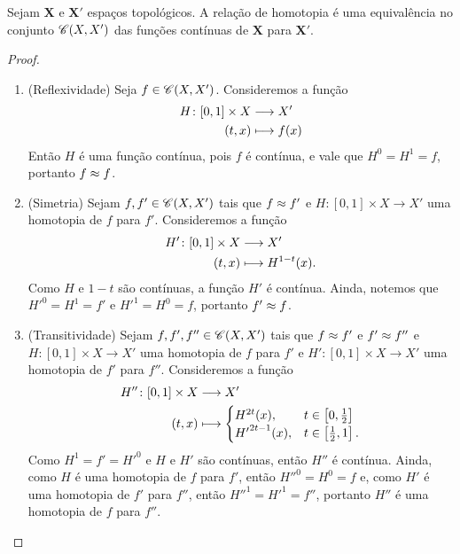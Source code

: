 \begin{proposition}
Sejam $\bm X$ e $\bm X'$ espaços topológicos. A relação de homotopia é uma equivalência no conjunto $\mathscr{C}(X,X')$ das funções contínuas de $\bm X$ para $\bm X'$.
\end{proposition}
\begin{proof}
	\begin{enumerate}
	\item (Reflexividade) Seja $f \in \mathscr{C}(X,X')$. Consideremos a função
		\begin{align*}
		{H}\colon {[0,1] \times X} &\longrightarrow {X'} \\{(t,x)} &\longmapsto f(x)
		\end{align*}
Então $H$ é uma função contínua, pois $f$ é contínua, e vale que $H^0 = H^1 = f$, portanto $f \approx f$.
	
	\item (Simetria) Sejam $f,f' \in \mathscr{C}(X,X')$ tais que $f \approx f'$ e $H\colon [0,1] \times X \to X'$ uma homotopia de $f$ para $f'$. Consideremos a função
		\begin{align*}
		{H'}\colon {[0,1] \times X} &\longrightarrow {X'} \\{(t,x)} &\longmapsto H^{1-t}(x).
		\end{align*}
Como $H$ e $1-t$ são contínuas, a função $H'$ é contínua. Ainda, notemos que ${H'}^0 = H^1 = f'$ e ${H'}^1 = H^0 = f$, portanto $f' \approx f$.

	\item (Transitividade) Sejam $f,f',f'' \in \mathscr{C}(X,X')$ tais que $f \approx f'$ e $f' \approx f''$ e $H\colon [0,1] \times X \to X'$ uma homotopia de $f$ para $f'$ e $H'\colon [0,1] \times X \to X'$ uma homotopia de $f'$ para $f''$. Consideremos a função
		\begin{align*}
		\func{H''}{[0,1] \times X}{X'}{(t,x)}{
			\begin{cases}
				H^{2t}(x),& t \in \left[0,\frac{1}{2}\right] \\
				{H'}^{2t-1}(x),& t \in \left[\frac{1}{2},1\right].
			\end{cases}
		}
		\end{align*}
Como $H^1 = f' = {H'}^0$ e $H$ e $H'$ são contínuas, então $H''$ é contínua. Ainda, como $H$ é uma homotopia de $f$ para $f'$, então ${H''}^0 = H^0 = f$ e, como $H'$ é uma homotopia de $f'$ para $f''$, então ${H''}^1 = {H'}^1 = f''$, portanto $H''$ é uma homotopia de $f$ para $f''$.
	\end{enumerate}
\end{proof}

